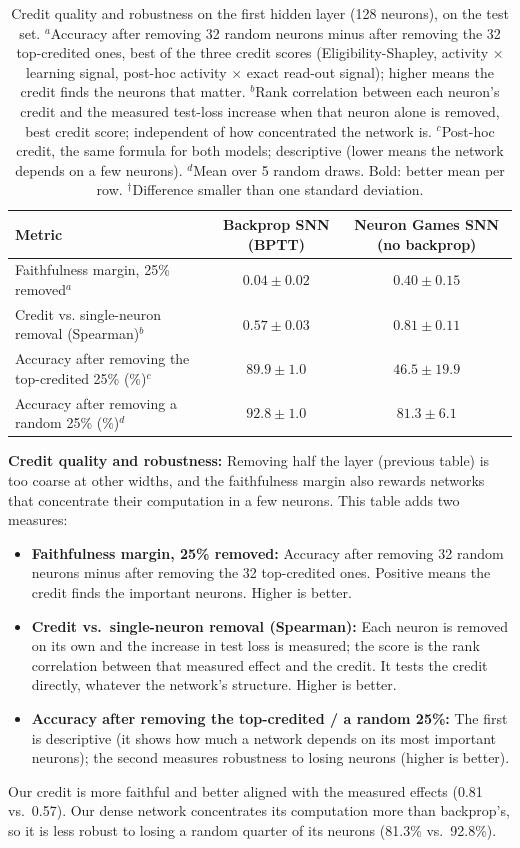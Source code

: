 \documentclass{article}
\begin{document}
\begin{table}[H]
\centering
\small
\caption{Credit quality and robustness on the first hidden layer (128 neurons), on the test set. $^a$Accuracy after removing 32 random neurons minus after removing the 32 top-credited ones, best of the three credit scores (Eligibility-Shapley, activity $\times$ learning signal, post-hoc activity $\times$ exact read-out signal); higher means the credit finds the neurons that matter. $^b$Rank correlation between each neuron's credit and the measured test-loss increase when that neuron alone is removed, best credit score; independent of how concentrated the network is. $^c$Post-hoc credit, the same formula for both models; descriptive (lower means the network depends on a few neurons). $^d$Mean over 5 random draws. Bold: better mean per row. $^\dagger$Difference smaller than one standard deviation.}
\label{tab:t1-credit}
\begin{tabular}{lcc}
\toprule
Metric & Backprop SNN (BPTT) & Neuron Games SNN (no backprop) \\
\midrule
Faithfulness margin, 25\% removed$^a$ & $0.04 \pm 0.02$ & $\boldsymbol{0.40 \pm 0.15}$ \\
Credit vs. single-neuron removal (Spearman)$^b$ & $0.57 \pm 0.03$ & $\boldsymbol{0.81 \pm 0.11}$ \\
\midrule
Accuracy after removing the top-credited 25\% (\%)$^c$ & $89.9 \pm 1.0$ & $46.5 \pm 19.9$ \\
Accuracy after removing a random 25\% (\%)$^d$ & $\boldsymbol{92.8 \pm 1.0}$ & $81.3 \pm 6.1$ \\
\bottomrule
\end{tabular}
\end{table}

{\small
\noindent\textbf{Credit quality and robustness:} Removing half the layer (previous table) is too coarse at other
widths, and the faithfulness margin also rewards networks that concentrate their computation in a few neurons.
This table adds two measures:
\begin{itemize}
  \item \textbf{Faithfulness margin, 25\% removed:} Accuracy after removing 32 random neurons minus after removing
    the 32 top-credited ones. Positive means the credit finds the important neurons. Higher is better.
  \item \textbf{Credit vs.\ single-neuron removal (Spearman):} Each neuron is removed on its own and the increase in
    test loss is measured; the score is the rank correlation between that measured effect and the credit. It tests
    the credit directly, whatever the network's structure. Higher is better.
  \item \textbf{Accuracy after removing the top-credited / a random 25\%:} The first is descriptive (it shows how
    much a network depends on its most important neurons); the second measures robustness to losing neurons
    (higher is better).
\end{itemize}
Our credit is more faithful and better aligned with the measured effects (0.81 vs.\ 0.57). Our dense network
concentrates its computation more than backprop's, so it is less robust to losing a random quarter of its
neurons (81.3\% vs.\ 92.8\%).
}
\end{document}
